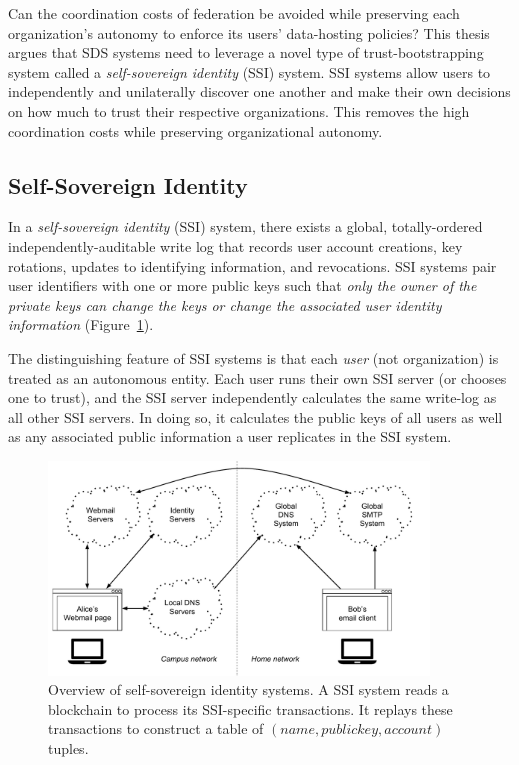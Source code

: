 Can the coordination costs of federation be avoided while
preserving each organization's autonomy to enforce its users' data-hosting
policies?  This thesis argues that SDS systems need to leverage a
novel type of trust-bootstrapping system called a \emph{self-sovereign identity}
(SSI) system.  SSI systems allow users to independently and unilaterally
discover one another and make their own decisions on how much to trust their
respective organizations.  This removes the high coordination costs while preserving
organizational autonomy.

\subsection{Self-Sovereign Identity}
\label{sec:chap2-ssi}

In a \emph{self-sovereign identity} (SSI) system, there exists a global,
totally-ordered independently-auditable write log that records user account creations, key rotations,
updates to identifying information, and revocations.  SSI systems 
pair user identifiers with one or more public keys such that \emph{only the 
owner of the private keys can 
change the keys or change the associated user identity information}
(Figure~\ref{fig:chap2-ssi-system}).

The distinguishing feature of SSI systems is that each \emph{user} (not
organization) is treated as an autonomous entity.  Each user runs their own
SSI server (or chooses one to trust), and the SSI server independently
calculates the same write-log as all other SSI servers.
In doing so, it calculates the public keys of all users as well as any
associated public information a user replicates in the SSI system.

\begin{figure}[h!]
   \centering
   \includegraphics[width=0.9\textwidth,page=14]{figures/dissertation-figures}
   \caption{Overview of self-sovereign identity systems.  A SSI system reads a
   blockchain to process its SSI-specific transactions.  It replays these
   transactions to construct a table of $(name, public key, account)$ tuples.}
   \label{fig:chap2-ssi-system}
\end{figure}

